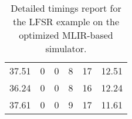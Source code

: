 \begin{table}[h]
{\begin{tabular}{cccccc}
            37.51              & 0                          & 0                          & 8                          & 17                         & 12.51                  \\
            36.24              & 0                          & 0                          & 8                          & 16                         & 12.24                  \\
            37.61              & 0                          & 0                          & 9                          & 17                         & 11.61                  \\
            \bottomrule
        \end{tabular}
    }
    \caption{Detailed timings report for the LFSR example on the optimized MLIR-based simulator.}
\end{table}

